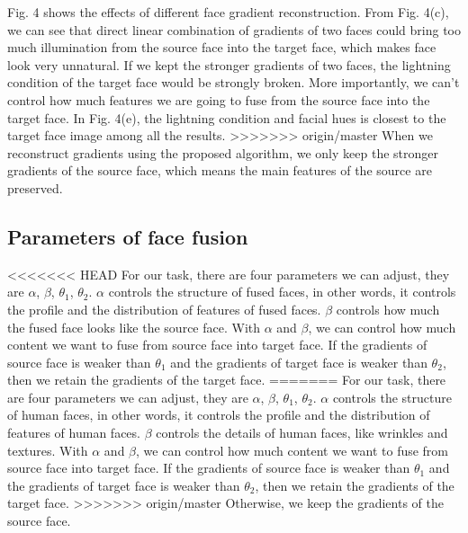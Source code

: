 Fig. 4 shows the effects of different face gradient reconstruction. From Fig. 4(c), we can see that direct linear combination of  gradients of two faces could bring too much illumination from the source face into the target face, which makes face look very unnatural. 
%
If we kept the stronger gradients of two faces, the lightning condition of the target face would be strongly broken. 
%
More importantly, we can't control how much features we are going to fuse from the source face into the target face. 
In Fig. 4(e), the lightning condition and facial hues is closest to the target face image among all the results. 
>>>>>>> origin/master
%
When we reconstruct gradients using the proposed algorithm, we only keep the stronger gradients of the source face, which means the main features of the source are preserved.

\subsection{Parameters of face fusion}

<<<<<<< HEAD
 For our task, there are four parameters we can adjust, they are $\alpha$, $\beta$, $\theta_1$, $\theta_2$. $\alpha$ controls the structure of fused faces, in other words, it controls the profile and the distribution of features of fused faces. $\beta$ controls how much the fused face looks like the source face.
 With $\alpha$ and $\beta$, we can control how much content we want to fuse from source face into target face.
 If the gradients of source face is weaker than $\theta_1$ and the gradients of target face is weaker than $\theta_2$, then we retain the gradients of the target face.
=======
 For our task, there are four parameters we can adjust, they are $\alpha$, $\beta$, $\theta_1$, $\theta_2$. $\alpha$ controls the structure of human faces, in other words, it controls the profile and the distribution of features of human faces. 
 $\beta$ controls the details of human faces, like wrinkles and textures. 
 With $\alpha$ and $\beta$, we can control how much content we want to fuse from source face into target face. 
 If the gradients of source face is weaker than $\theta_1$ and the gradients of target face is weaker than $\theta_2$, then we retain the gradients of the target face. 
>>>>>>> origin/master
 Otherwise, we keep the gradients of the source face.

